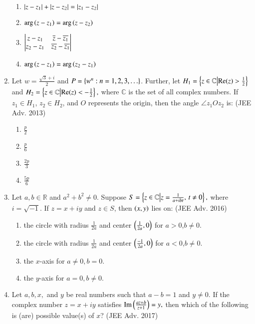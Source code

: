 \documentclass[journal,12pt,twocolumn]{IEEEtran}
\theoremstyle{remark}
\begin{document}
\begin{enumerate}
\begin{enumerate}
    \item $\left\vert z-z_1\right\vert+\left\vert z-z_2\right\vert=\left\vert z_1-z_2\right\vert$
    \item $\mathrm{arg}\left(z-z_1\right)=\mathrm{arg}\left(z-z_2\right)$
    \item $\begin{vmatrix}z-z_1 & \overline{z}-\overline{z_1} \\z_2-z_1 & \overline{z_2}-\overline{z_1}\end{vmatrix}$
    \item $\mathrm{arg}\left(z-z_1\right)=\mathrm{arg}\left(z_2-z_1\right)$
\end{enumerate}
\item Let $w=\frac{\sqrt{3}+i}{2}$ and $P=\left\{w^n:n=1,2,3,\ldots\right\}$. Further, let $H_1=\left\{z \in \mathbb{C} \middle|\text{Re}(z) > \frac{1}{2}\right\}$ and $H_2=\left\{ z \in \mathbb{C}\middle|\text{Re}(z) < -\frac{1}{2}\right\},$
where $\mathbb{C}$ is the set of all complex numbers. If $z_1 \in H_1$, $z_2 \in H_2$, and $O$ represents the origin, then the angle $\angle z_1Oz_2$ is: \hfill (JEE Adv. 2013)
\begin{multicols}{4}
    \begin{enumerate}
    \item $\frac{p}{2}$
    \item $\frac{p}{6}$
    \item $\frac{2p}{3}$
    \item $\frac{5p}{6}$
    \end{enumerate}
\end{multicols}
\item Let $a,b \in \mathbb{R}$ and $a^2+b^2 \ne 0$. Suppose $S=\left\{ z \in \mathbb{C}\middle|z = \frac{1}{a + ibt}, \, t \ne 0\right\},$
    where $i=\sqrt{-1}$. If $z=x+iy$ and $z \in S$, then $\left(x,y\right)$ lies on: \hfill (JEE Adv. 2016)
    \begin{enumerate}
    \item the circle with radius $\frac{1}{2a}$ and center $\left(\frac{1}{2a},0\right)$ for $a>0$,$b \ne 0$.
    \item the circle with radius $\frac{1}{2a}$ and center $\left(\frac{-1}{2a}, 0\right)$ for $a<0$,$b \ne 0$.
    \item the $x$-axis for $a \ne 0 ,b=0$.
    \item the $y$-axis for $a=0, b \ne 0$.
    \end{enumerate}
\item Let $a,b,x,$ and $y$ be real numbers such that $a-b=1$ and $y \ne 0$. If the complex number $z=x+iy$ satisfies $\mathrm{Im}\left(\frac{az+b}{z+1}\right)=y,$ then which of the following is (are) possible value(s) of $x$? \hfill (JEE Adv. 2017)

\end{enumerate}
\end{document}
